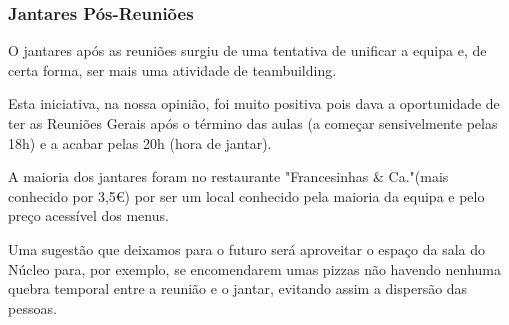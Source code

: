 
\subsubsection{Jantares Pós-Reuniões}

O jantares após as reuniões surgiu de uma tentativa de unificar a equipa e, de certa forma, ser mais uma atividade de teambuilding.

Esta iniciativa, na nossa opinião, foi muito positiva pois dava a oportunidade de ter as Reuniões Gerais após o término das aulas (a começar sensivelmente pelas 18h) e a acabar pelas 20h (hora de jantar).

A maioria dos jantares foram no restaurante "Francesinhas \& Ca."\space (mais conhecido por 3,5€) por ser um local conhecido pela maioria da equipa e pelo preço acessível dos menus.

Uma sugestão que deixamos para o futuro será aproveitar o espaço da sala do Núcleo para, por exemplo, se encomendarem umas pizzas não havendo nenhuma quebra temporal entre a reunião e o jantar, evitando assim a dispersão das pessoas.